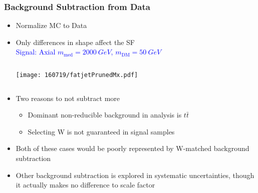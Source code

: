 \documentclass{beamer}
\begin{document}
\begin{frame}
  \frametitle{Background Subtraction from Data}
  \begin{itemize}
  \item Normalize MC to Data
  \item Only differences in shape affect the SF \vspace{-2pt} \\
    \textcolor{blue}{\scriptsize \hspace{-35pt} Signal: Axial
      $m_\text{med} = \SI{2000}{GeV}$,
      $m_\text{DM} = \SI{50}{GeV}$}
    \begin{columns}
      \begin{column}{0.4\linewidth}
        \centering
        \texttt{[image: 160719/fatjetPrunedMx.pdf]}
      \end{column}
    \end{columns}
  \item Two reasons to not subtract more
    \begin{itemize}
    \item Dominant non-reducible background in analysis is $t\bar{t}$
    \item Selecting W is not guaranteed in signal samples
    \end{itemize}
  \item Both of these cases would be poorly represented by
    W-matched background subtraction
  \item Other background subtraction is explored in systematic uncertainties, though it actually makes no
    difference to scale factor
  \end{itemize}
\end{frame}
\end{document}
